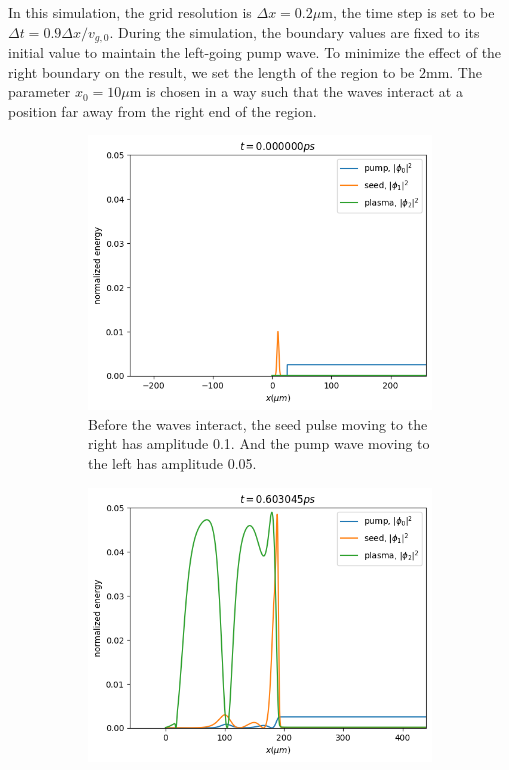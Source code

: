 \documentclass{article}
\begin{document}
    In this simulation, the grid resolution is $\Delta x=0.2\mu$m, the time step is set to be $\Delta t=0.9\Delta x/v_{g,0}$. During the simulation, the boundary values are fixed to its initial value to maintain the left-going pump wave. To minimize the effect of the right boundary on the result, we set the length of the region to be $2$mm. The parameter $x_0=10\mu$m is chosen in a way such that the waves interact at a position far away from the right end of the region.

    \begin{figure} [H]
        \begin{subfigure}[b]{0.5\textwidth}
            \includegraphics[width=\textwidth]{img/t=0.00.png}
            \caption{Before the waves interact, the seed pulse moving to the right has amplitude 0.1. And the pump wave moving to the left has amplitude 0.05.}    
        \end{subfigure}
        \begin{subfigure}[b]{0.5\textwidth}
            \includegraphics[width=\textwidth]{img/t=0.60.png}

\end{subfigure}
\end{figure}
\end{document}
